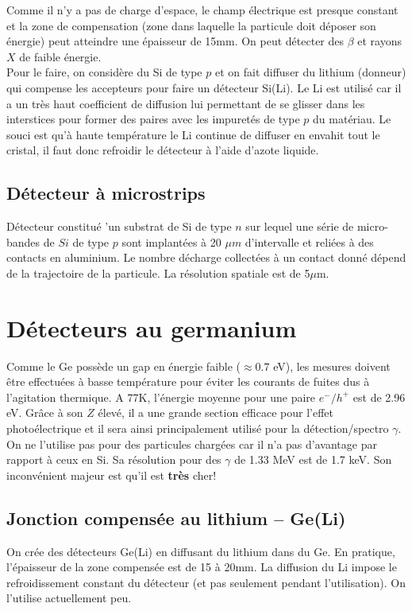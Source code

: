 Comme il n'y a pas de charge d'espace, le champ électrique est presque constant et la zone de compensation (zone dans laquelle la particule doit déposer son énergie) peut atteindre une épaisseur de 15mm. On peut détecter des $\beta$ et rayons $X$ de faible énergie.\\

Pour le faire, on considère du Si de type $p$ et on fait diffuser du lithium (donneur) qui 
compense les accepteurs pour faire un détecteur Si(Li). Le Li est utilisé car il a un très
haut coefficient de diffusion lui permettant de se glisser dans les interstices pour former
des paires avec les impuretés de type $p$ du matériau. Le souci est qu'à haute température le Li
continue de diffuser en envahit tout le cristal, il faut donc refroidir le détecteur à l'aide
d'azote liquide.


\subsection{Détecteur à microstrips}
Détecteur constitué 'un substrat de Si de type $n$ sur lequel une série de micro-bandes de $Si$ de
type $p$ sont implantées à 20 $\mu m$ d'intervalle et reliées à des contacts en aluminium. Le nombre
décharge collectées à un contact donné dépend de la trajectoire de la particule. La résolution
spatiale est de 5$\mu$m.

\section{Détecteurs au germanium}%
Comme le Ge possède un gap en énergie faible ($\approx0.7$ eV), les mesures doivent être effectuées
à basse température pour éviter les courants de fuites dus à l'agitation thermique. A 77K, 
l'énergie moyenne pour une paire $e^-/h^+$ est de 2.96 eV. Grâce à son $Z$ élevé, il a une grande
section efficace pour l'effet photoélectrique et il sera ainsi principalement utilisé pour la
détection/spectro $\gamma$. On ne l'utilise pas pour des particules chargées car il n'a pas 
d'avantage par rapport à ceux en Si. Sa résolution pour des $\gamma$ de 1.33 MeV est de
1.7 keV. Son inconvénient majeur est qu'il est \textbf{très} cher!

\subsection{Jonction compensée au lithium – Ge(Li)}
On crée des détecteurs Ge(Li) en diffusant du lithium dans du Ge. En pratique, l'épaisseur de la
zone compensée est de 15 à 20mm. La diffusion du Li impose le refroidissement constant du 
détecteur (et pas seulement pendant l'utilisation). On l'utilise actuellement peu.

